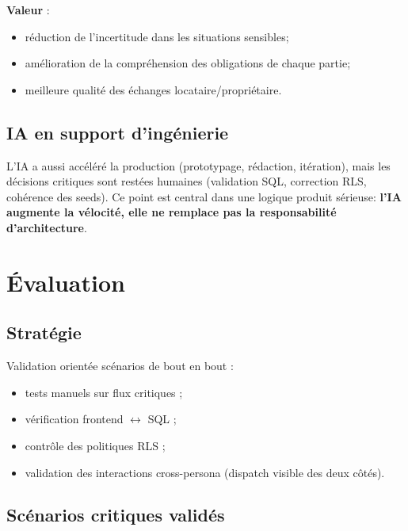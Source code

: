 \documentclass[11pt,a4paper]{article}
\begin{document}
\textbf{Valeur} :
\begin{itemize}[leftmargin=1.4em]
  \item réduction de l'incertitude dans les situations sensibles;
  \item amélioration de la compréhension des obligations de chaque partie;
  \item meilleure qualité des échanges locataire/propriétaire.
\end{itemize}

\subsection{IA en support d'ingénierie}

L'IA a aussi accéléré la production (prototypage, rédaction, itération), mais les décisions critiques sont restées humaines (validation SQL, correction RLS, cohérence des seeds). Ce point est central dans une logique produit sérieuse: \textbf{l'IA augmente la vélocité, elle ne remplace pas la responsabilité d'architecture}.

\section{Évaluation}

\subsection{Stratégie}

Validation orientée scénarios de bout en bout :

\begin{itemize}[leftmargin=1.4em]
  \item tests manuels sur flux critiques ;
  \item vérification frontend \(\leftrightarrow\) SQL ;
  \item contrôle des politiques RLS ;
  \item validation des interactions cross-persona (dispatch visible des deux côtés).
\end{itemize}

\subsection{Scénarios critiques validés}
\end{document}
